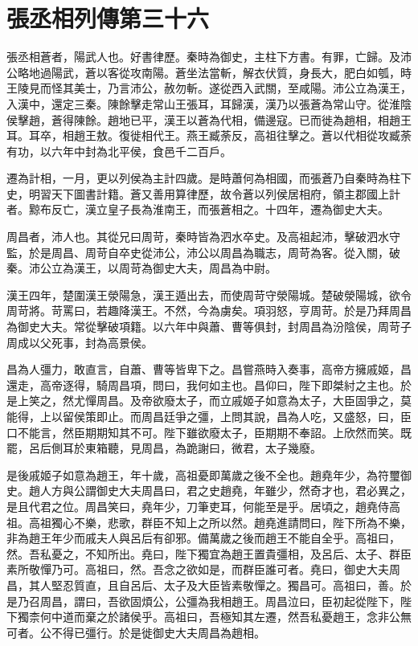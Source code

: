 \chapter{張丞相列傳第三十六}

張丞相蒼者，陽武人也。好書律歷。秦時為御史，主柱下方書。有罪，亡歸。及沛公略地過陽武，蒼以客從攻南陽。蒼坐法當斬，解衣伏質，身長大，肥白如瓠，時王陵見而怪其美士，乃言沛公，赦勿斬。遂從西入武關，至咸陽。沛公立為漢王，入漢中，還定三秦。陳餘擊走常山王張耳，耳歸漢，漢乃以張蒼為常山守。從淮陰侯擊趙，蒼得陳餘。趙地已平，漢王以蒼為代相，備邊寇。已而徙為趙相，相趙王耳。耳卒，相趙王敖。復徙相代王。燕王臧荼反，高祖往擊之。蒼以代相從攻臧荼有功，以六年中封為北平侯，食邑千二百戶。

遷為計相，一月，更以列侯為主計四歲。是時蕭何為相國，而張蒼乃自秦時為柱下史，明習天下圖書計籍。蒼又善用算律歷，故令蒼以列侯居相府，領主郡國上計者。黥布反亡，漢立皇子長為淮南王，而張蒼相之。十四年，遷為御史大夫。

周昌者，沛人也。其從兄曰周苛，秦時皆為泗水卒史。及高祖起沛，擊破泗水守監，於是周昌、周苛自卒史從沛公，沛公以周昌為職志，周苛為客。從入關，破秦。沛公立為漢王，以周苛為御史大夫，周昌為中尉。

漢王四年，楚圍漢王滎陽急，漢王遁出去，而使周苛守滎陽城。楚破滎陽城，欲令周苛將。苛罵曰，若趣降漢王。不然，今為虜矣。項羽怒，亨周苛。於是乃拜周昌為御史大夫。常從擊破項籍。以六年中與蕭、曹等俱封，封周昌為汾陰侯，周苛子周成以父死事，封為高景侯。

昌為人彊力，敢直言，自蕭、曹等皆卑下之。昌嘗燕時入奏事，高帝方擁戚姬，昌還走，高帝逐得，騎周昌項，問曰，我何如主也。昌仰曰，陛下即桀紂之主也。於是上笑之，然尤憚周昌。及帝欲廢太子，而立戚姬子如意為太子，大臣固爭之，莫能得，上以留侯策即止。而周昌廷爭之彊，上問其說，昌為人吃，又盛怒，曰，臣口不能言，然臣期期知其不可。陛下雖欲廢太子，臣期期不奉詔。上欣然而笑。既罷，呂后側耳於東箱聽，見周昌，為跪謝曰，微君，太子幾廢。

是後戚姬子如意為趙王，年十歲，高祖憂即萬歲之後不全也。趙堯年少，為符璽御史。趙人方與公謂御史大夫周昌曰，君之史趙堯，年雖少，然奇才也，君必異之，是且代君之位。周昌笑曰，堯年少，刀筆吏耳，何能至是乎。居頃之，趙堯侍高祖。高祖獨心不樂，悲歌，群臣不知上之所以然。趙堯進請問曰，陛下所為不樂，非為趙王年少而戚夫人與呂后有卻邪。備萬歲之後而趙王不能自全乎。高祖曰，然。吾私憂之，不知所出。堯曰，陛下獨宜為趙王置貴彊相，及呂后、太子、群臣素所敬憚乃可。高祖曰，然。吾念之欲如是，而群臣誰可者。堯曰，御史大夫周昌，其人堅忍質直，且自呂后、太子及大臣皆素敬憚之。獨昌可。高祖曰，善。於是乃召周昌，謂曰，吾欲固煩公，公彊為我相趙王。周昌泣曰，臣初起從陛下，陛下獨柰何中道而棄之於諸侯乎。高祖曰，吾極知其左遷，然吾私憂趙王，念非公無可者。公不得已彊行。於是徙御史大夫周昌為趙相。

